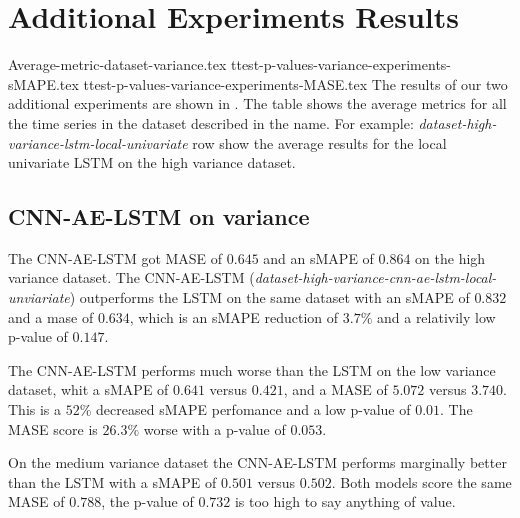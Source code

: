 \section{Additional Experiments Results}
\label{section:Results:AdditionalExperimentResults}

{Average-metric-dataset-variance.tex}
{ttest-p-values-variance-experiments-sMAPE.tex}
{ttest-p-values-variance-experiments-MASE.tex}
The results of our two additional experiments are shown in .
The table shows the average metrics for all the time series in the dataset described in the name.
For example: \textit{dataset-high-variance-lstm-local-univariate} row show the average
results for the local univariate LSTM on the high variance dataset.

\subsection{CNN-AE-LSTM on variance}
The CNN-AE-LSTM got MASE of $0.645$ and an sMAPE of $0.864$
on the high variance dataset. The CNN-AE-LSTM (\textit{dataset-high-variance-cnn-ae-lstm-local-unviariate}) outperforms the LSTM on
the same dataset with an sMAPE of $0.832$ and a mase of $0.634$, which is an sMAPE reduction of $3.7\%$
and a relativily low p-value of $0.147$.

The CNN-AE-LSTM performs much worse than the LSTM on the low variance dataset,
whit a sMAPE of $0.641$ versus $0.421$, and a MASE of $5.072$ versus $3.740$.
This is a $52\%$ decreased sMAPE perfomance and a low p-value of $0.01$.
The MASE score is $26.3\%$ worse with a p-value of $0.053$.

On the medium variance dataset the CNN-AE-LSTM performs marginally better than the LSTM
with a sMAPE of $0.501$ versus $0.502$. Both models score the same MASE of $0.788$, the
p-value of $0.732$ is too high to say anything of value.



